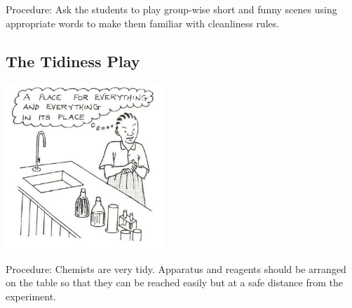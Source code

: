 \begin{multicols}{2}
\begin{description*}
\item[Procedure:]{Ask the students to play group-wise short
and funny scenes using appropriate words to
make them familiar with cleanliness rules.}
\end{description*}

\subsection{The Tidiness Play}

\begin{center}
\includegraphics[width=0.45\textwidth]{./img/source/tidiness-play.jpg}
\end{center}

\begin{description*}
\item[Procedure:]{Chemists are very tidy. Apparatus and
reagents should be arranged on the table so that
they can be reached easily but at a safe distance
from the experiment.}
\end{description*}



\end{multicols}

\pagebreak